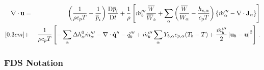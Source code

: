 \begin{eqnarray}
\label{eqn_divconstraint_final}
\nabla\cdot\mathbf{u}  &=& \left(\frac{1}{\rho c_p T}  -  \frac{1}{\overline{p}_i}\right) \frac{\mbox{D}\overline{p}_i}{\mbox{D} t} + \frac{1}{\rho} \left[ \dot{m}_b^{{\prime\prime\prime}} \frac{\overline{W}}{\overline{W}_b} +  \sum_\alpha \left( \frac{\overline{W}}{W_\alpha} - \frac{h_{s,\alpha}}{c_p T} \right)  \left\{  \dot{m}_\alpha^{{\prime\prime\prime}}
- \nabla\cdot\mathbf{J}_{\alpha} \right\} \right] \nonumber \\ [0.3cm]
&+&  \frac{1}{\rho c_p T} \left[ - \sum_\alpha \Delta h^0_\alpha \dot{m}_\alpha^{{\prime\prime\prime}} - \nabla\cdot \dot{\mathbf{q}}^{\prime\prime} -\dot{q}_b''' + \dot{m}_{b}^{{\prime\prime\prime}} \sum_\alpha Y_{b,\alpha} c_{p,\alpha}(T_b-T) + \frac{\dot{m}_{b}^{{\prime\prime\prime}}}{2}\left|\mathbf{u}_b-\mathbf{u}\right|^2 \right] \,\mbox{.} 
\end{eqnarray}


\subsubsection{FDS Notation}
\label{fds_notation}

